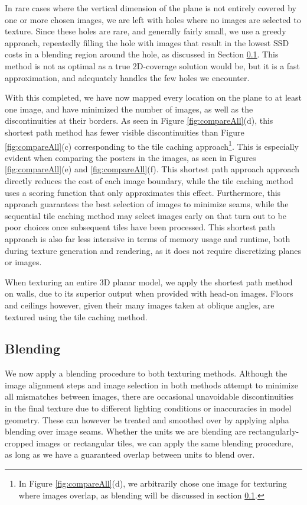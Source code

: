 \documentclass[]{spie}  %
\begin{document}
{In rare cases where the vertical dimension of the plane is not
entirely covered by one or more chosen images, we are left with holes
where no images are selected to texture. Since these holes are rare,
and generally fairly small, we use a greedy approach, repeatedly
filling the hole with images that result in the lowest SSD costs in a
blending region around the hole, as discussed in Section
\ref{sec:blending}. This method is not as optimal as a true
2D-coverage solution would be, but it is a fast approximation, and
adequately handles the few holes we encounter.

With this completed, we have now mapped every location on the plane to
at least one image, and have minimized the number of images, as well
as the discontinuities at their borders. As seen in Figure
\ref{fig:compareAll}(d), this shortest path method has fewer visible
discontinuities than Figure \ref{fig:compareAll}(c) corresponding to
the tile caching approach\footnote{In Figure \ref{fig:compareAll}(d),
  we arbitrarily chose one image for texturing where images overlap,
  as blending will be discussed in section \ref{sec:blending}.}. This
is especially evident when comparing the posters in the images, as
seen in Figures \ref{fig:compareAll}(e) and
\ref{fig:compareAll}(f). This shortest path approach approach directly
reduces the cost of each image boundary, while the tile caching method
uses a scoring function that only approximates this
effect. Furthermore, this approach guarantees the best selection of
images to minimize seams, while the sequential tile caching method may
select images early on that turn out to be poor choices once
subsequent tiles have been processed. This shortest path approach is
also far less intensive in terms of memory usage and runtime, both
during texture generation and rendering, as it does not require
discretizing planes or images.

When texturing an entire 3D planar model, we apply the shortest path
method on walls, due to its superior output when provided with head-on
images. Floors and ceilings however, given their many images taken at
oblique angles, are textured using the tile caching method.


\subsection{Blending}
\label{sec:blending}
We now apply a blending procedure to both texturing methods. Although
the image alignment steps and image selection in both methods attempt
to minimize all mismatches between images, there are occasional
unavoidable discontinuities in the final texture due to different
lighting conditions or inaccuracies in model geometry. These can
however be treated and smoothed over by applying alpha blending over
image seams.  Whether the units we are blending are
rectangularly-cropped images or rectangular tiles, we can apply the
same blending procedure, as long as we have a guaranteed overlap
between units to blend over.

}
\end{document}

